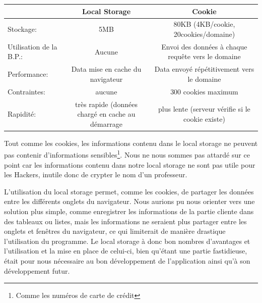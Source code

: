 \begin{tabular}{|l|c|c|}
  	\hline
   		& Local Storage & Cookie \\
  	\hline
  		Stockage: & 5MB & 80KB (4KB/cookie, 20cookies/domaine) \\
	\hline  
  		Utilisation de la B.P.: & Aucune & Envoi des données à chaque requête vers le domaine \\
  	\hline
  		Performance: & Data mise en cache du navigateur & Data envoyé répétitivement vers le domaine \\
  	\hline
  		Contraintes: & aucune & 300 cookies maximum \\
  	\hline
  		Rapidité: & très rapide (données chargé en cache au démarrage & plus lente (serveur vérifie si le cookie existe) \\
  	\hline
\end{tabular}


Tout comme les cookies, les informations contenu dans le local storage ne peuvent pas contenir d'informations sensibles\footnote{Comme les numéros de carte de crédit}. Nous ne nous sommes pas attardé sur ce point car les informations contenu dans notre local storage ne sont pas utile pour les Hackers, inutile donc de crypter le nom d'un professeur. 

L'utilisation du local storage permet, comme les cookies, de partager les données entre les différents onglets du navigateur. Nous aurions pu nous orienter vers une solution plus simple, comme enregistrer les informations de la partie cliente dans des tableaux ou listes, mais les informations ne seraient plus partager entre les onglets et fenêtres du navigateur, ce qui limiterait de manière drastique l'utilisation du programme. Le local storage à donc bon nombres d'avantages et l'utilisation et la mise en place de celui-ci, bien qu'étant une partie fastidieuse, était pour nous nécessaire au bon développement de l'application ainsi qu'à son développement futur.

